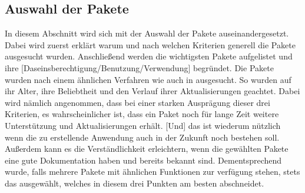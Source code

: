 \subsection{Auswahl der Pakete}\label{subsection:auswahlDerPakete}\myCheckmark
In diesem Abschnitt wird sich mit der Auswahl der Pakete auseinandergesetzt. Dabei wird zuerst erklärt warum und nach welchen Kriterien generell die Pakete ausgesucht wurden. Anschließend werden die wichtigsten Pakete aufgelistet und ihre [Daseinsberechtigung/Benutzung/Verwendung] begründet.\newline%
	Die Pakete wurden nach einem ähnlichen Verfahren wie auch in  ausgesucht. So wurden auf ihr Alter, ihre Beliebtheit und den Verlauf ihrer Aktualisierungen geachtet. %
	Dabei wird nämlich angenommen, dass bei einer starken Ausprägung dieser drei Kriterien, es wahrscheinlicher ist, dass ein Paket noch für lange Zeit weitere Unterstützung und Aktualisierungen erhält. [Und] das ist wiederum nützlich wenn die zu erstellende Anwendung auch in der Zukunft noch bestehen soll. %
	Außerdem kann es die Verständlichkeit erleichtern, wenn die gewählten Pakete eine gute Dokumentation haben und bereits bekannt sind. %
	Dementsprechend wurde, falls mehrere Pakete mit ähnlichen Funktionen zur verfügung stehen, stets das ausgewählt, welches in diesem drei Punkten am besten abschneidet.%

